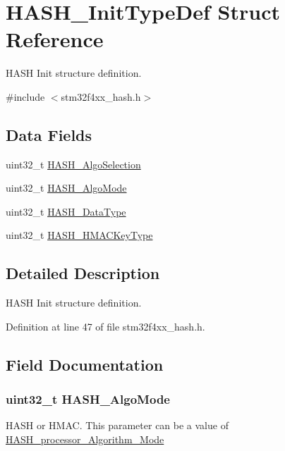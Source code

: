\hypertarget{struct_h_a_s_h___init_type_def}{\section{H\-A\-S\-H\-\_\-\-Init\-Type\-Def Struct Reference}
\label{struct_h_a_s_h___init_type_def}
}


H\-A\-S\-H Init structure definition.  




{\ttfamily \#include $<$stm32f4xx\-\_\-hash.\-h$>$}

\subsection*{Data Fields}
\begin{DoxyCompactItemize}
\item 
uint32\-\_\-t \hyperlink{struct_h_a_s_h___init_type_def_aaaf1a08cbec063fbcbd1c1470ff5010b}{H\-A\-S\-H\-\_\-\-Algo\-Selection}
\item 
uint32\-\_\-t \hyperlink{struct_h_a_s_h___init_type_def_a0c19157ec9995fa304fe510de3df133b}{H\-A\-S\-H\-\_\-\-Algo\-Mode}
\item 
uint32\-\_\-t \hyperlink{struct_h_a_s_h___init_type_def_a755e3df3614cd3dcbb9a41ed92889e63}{H\-A\-S\-H\-\_\-\-Data\-Type}
\item 
uint32\-\_\-t \hyperlink{struct_h_a_s_h___init_type_def_a4934882b46f2ebf5a1cd552e6793fa5c}{H\-A\-S\-H\-\_\-\-H\-M\-A\-C\-Key\-Type}
\end{DoxyCompactItemize}


\subsection{Detailed Description}
H\-A\-S\-H Init structure definition. 

Definition at line 47 of file stm32f4xx\-\_\-hash.\-h.



\subsection{Field Documentation}
\hypertarget{struct_h_a_s_h___init_type_def_a0c19157ec9995fa304fe510de3df133b}{
\subsubsection[{H\-A\-S\-H\-\_\-\-Algo\-Mode}]{\setlength{\rightskip}{0pt plus 5cm}uint32\-\_\-t H\-A\-S\-H\-\_\-\-Algo\-Mode}}\label{struct_h_a_s_h___init_type_def_a0c19157ec9995fa304fe510de3df133b}
H\-A\-S\-H or H\-M\-A\-C. This parameter can be a value of \hyperlink{group___h_a_s_h__processor___algorithm___mode}{H\-A\-S\-H\-\_\-processor\-\_\-\-Algorithm\-\_\-\-Mode} 

